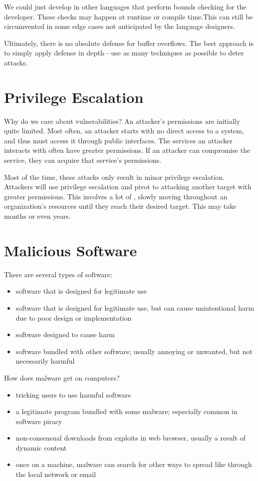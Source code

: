 \documentclass[code]{amznotes}
\begin{document}
We could just develop in other languages that perform bounds checking for the developer. These checks may happen at runtime or compile time.This can still be circumvented in some edge cases not anticipated by the language designers.

Ultimately, there is no absolute defense for buffer overflows. The best approach is to simply apply defense in depth---use as many techniques as possible to deter attacks.

\section{Privilege Escalation}

Why do we care about vulnerabilities? An attacker's permissions are initially quite limited. Most often, an attacker starts with no direct access to a system, and thus must access it through public interfaces. The services an attacker interacts with often have greater permissions. If an attacker can compromise the service, they can acquire that service's permissions.

Most of the time, these attacks only result in minor privilege escalation. Attackers will use privilege escalation and pivot to attacking another target with greater permissions. This involves a lot of , slowly moving throughout an organization's resources until they reach their desired target. This may take months or even years.

\section{Malicious Software}

There are several types of software:
\begin{itemize}[noitemsep]
    \item {} software that is designed for legitimate use
    \item {} software that is designed for legitimate use, but can cause unintentional harm due to poor design or implementation
    \item {} software designed to cause harm
    \item {} software bundled with other software; usually annoying or unwanted, but not necessarily harmful
\end{itemize}

How does malware get on computers?
\begin{itemize}[noitemsep]
    \item {} tricking users to use harmful software
    \item {} a legitimate program bundled with some malware; especially common in software piracy
    \item {} non-consensual downloads from exploits in web browser, usually a result of dynamic content
    \item {} once on a machine, malware can search for other ways to spread like through the local network or email
\end{itemize}
\end{document}
